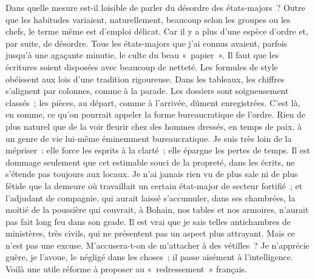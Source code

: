 \documentclass[french,twoside]{book} %
\begin{document}
\noindent Dans quelle mesure est-il loisible de parler du désordre des états-majors ? Outre que les habitudes variaient, naturellement, beaucoup selon les groupes ou les chefs, le terme même est d’emploi délicat. Car il y a plus d’une espèce d’ordre et, par suite, de désordre. Tous les états-majors que j’ai connus avaient, parfois jusqu’à une agaçante minutie, le culte du beau « papier ». Il faut que les écritures soient disposées avec beaucoup de netteté. Les formules de style obéissent aux lois d’une tradition rigoureuse. Dans les tableaux, les chiffres s’alignent par colonnes, comme à la parade. Les dossiers sont soigneusement classés ; les pièces, au départ, comme à l’arrivée, dûment enregistrées. C’est là, en somme, ce qu’on pourrait appeler la forme bureaucratique de l’ordre. Rien de plus naturel que de la voir fleurir chez des hommes dressés, en temps de paix, à un genre de vie lui-même éminemment bureaucratique. Je suis très loin de la mépriser : elle force les esprits à la clarté ; elle épargne les pertes de temps. Il est dommage seulement que cet estimable souci de la propreté, dans les écrits, ne s’étende pas toujours aux locaux. Je n’ai jamais rien vu de plus sale ni de plus fétide que la demeure où travaillait un   certain état-major de secteur fortifié ; et l’adjudant de compagnie, qui aurait laissé s’accumuler, dans ses chambrées, la moitié de la poussière qui couvrait, à Bohain, nos tables et nos armoires, n’aurait pas fait long feu dans son grade. Il est vrai que je sais telles antichambres de ministères, très civils, qui ne présentent pas un aspect plus attrayant. Mais ce n’est pas une excuse. M’accusera-t-on de m’attacher à des vétilles ? Je n’apprécie guère, je l’avoue, le négligé dans les choses ; il passe aisément à l’intelligence. Voilà une utile réforme à proposer au « redressement » français.\par
\end{document}
